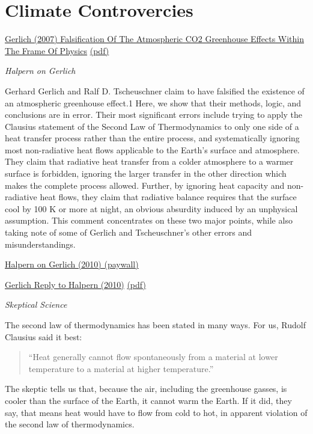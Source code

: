 \documentclass[
]{book}
\begin{document}
\hypertarget{climate-controvercies}{%
\chapter{Climate Controvercies}\label{climate-controvercies}}

\href{https://arxiv.org/abs/0707.1161v3}{Gerlich (2007) Falsification Of The Atmospheric CO2 Greenhouse Effects Within The Frame Of Physics}
\href{pdf/Gerlich_2007_Falsification_Greenhouse.pdf}{(pdf)}

\emph{Halpern on Gerlich}

Gerhard Gerlich and Ralf D. Tscheuschner claim to have falsified the existence of an atmospheric greenhouse effect.1 Here, we show that their methods, logic, and conclusions are in error. Their most significant errors include trying to apply the Clausius statement of the Second Law of Thermodynamics to only one side of a heat transfer process rather than the entire process, and systematically ignoring most non-radiative heat flows applicable to the Earth's surface and atmosphere. They claim that radiative heat transfer from a colder atmosphere to a warmer surface is forbidden, ignoring the larger transfer in the other direction which makes the complete process allowed. Further, by ignoring heat capacity and non-radiative heat flows, they claim that radiative balance requires that the surface cool by 100 K or more at night, an obvious absurdity induced by an unphysical assumption. This comment concentrates on these two major points, while also taking note of some of Gerlich and Tscheuschner's other errors and misunderstandings.

\href{https://ui.adsabs.harvard.edu/abs/2010IJMPB..24.1309H/abstract}{Halpern on Gerlich (2010) (paywall)}

\href{https://arxiv.org/abs/1012.0421}{Gerlich Reply to Halpern (2010)}
\href{pdf/Gerlich_2007_Falsification_Greenhouse_reply_to_Halpern.pdf}{(pdf)}

\emph{Skeptical Science}

The second law of thermodynamics has been stated in many ways. For us, Rudolf Clausius said it best:

\begin{quote}
``Heat generally cannot flow spontaneously from a material at lower temperature to a material at higher temperature.''
\end{quote}

The skeptic tells us that, because the air, including the greenhouse gasses, is cooler than the surface of the Earth, it cannot warm the Earth. If it did, they say, that means heat would have to flow from cold to hot, in apparent violation of the second law of thermodynamics.
\end{document}
